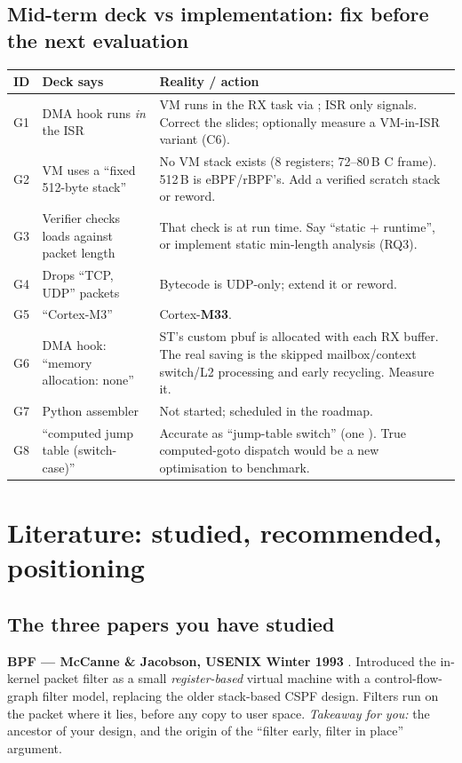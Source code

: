 \documentclass[10pt,a4paper]{article}
\begin{document}
\subsection{Mid-term deck vs implementation: fix before the next evaluation}
\begin{tabularx}{\textwidth}{@{}P{0.7cm}P{5.4cm}L@{}}
\toprule
\textbf{ID} & \textbf{Deck says} & \textbf{Reality / action} \\
\midrule
G1 & DMA hook runs \emph{in} the  ISR & VM runs in the RX task via ; ISR only signals. Correct the slides; optionally measure a VM-in-ISR variant (C6). \\
G2 & VM uses a ``fixed 512-byte stack'' & No VM stack exists (8 registers; 72--80\,B C frame). 512\,B is eBPF/rBPF's. Add a verified scratch stack or reword. \\
G3 & Verifier checks loads against packet length & That check is at run time. Say ``static + runtime'', or implement static min-length analysis (RQ3). \\
G4 & Drops ``TCP, UDP'' packets & Bytecode is UDP-only; extend it or reword. \\
G5 & ``Cortex-M3'' & Cortex-\textbf{M33}. \\
G6 & DMA hook: ``memory allocation: none'' & ST's custom pbuf is allocated with each RX buffer. The real saving is the skipped mailbox/context switch/L2 processing and early recycling. Measure it. \\
G7 & Python assembler & Not started; scheduled in the roadmap. \\
G8 & ``computed jump table (switch-case)'' & Accurate as ``jump-table switch'' (one ). True computed-goto dispatch would be a new optimisation to benchmark. \\
\bottomrule
\end{tabularx}

\section{Literature: studied, recommended, positioning}\label{sec:lit}
\subsection{The three papers you have studied}
\textbf{BPF --- McCanne \& Jacobson, USENIX Winter 1993} \cite{bpf93}. Introduced the in-kernel packet filter as a small \emph{register-based} virtual machine with a control-flow-graph filter model, replacing the older stack-based CSPF design. Filters run on the packet where it lies, before any copy to user space. \emph{Takeaway for you:} the ancestor of your design, and the origin of the ``filter early, filter in place'' argument.
\end{document}
